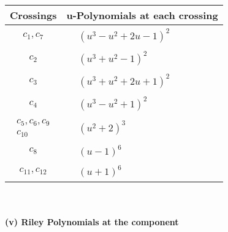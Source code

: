 \documentclass[1p]{elsarticle_modified}
\theoremstyle{definition}
\begin{document}
\begin{tabular}{m{50pt}|m{274pt}}
Crossings & \hspace{64pt}u-Polynomials at each crossing \\
\hline $$\begin{aligned}c_{1},c_{7}\end{aligned}$$&$\begin{aligned}
&(u^3- u^2+2 u-1)^2
\end{aligned}$\\
\hline $$\begin{aligned}c_{2}\end{aligned}$$&$\begin{aligned}
&(u^3+u^2-1)^2
\end{aligned}$\\
\hline $$\begin{aligned}c_{3}\end{aligned}$$&$\begin{aligned}
&(u^3+u^2+2 u+1)^2
\end{aligned}$\\
\hline $$\begin{aligned}c_{4}\end{aligned}$$&$\begin{aligned}
&(u^3- u^2+1)^2
\end{aligned}$\\
\hline $$\begin{aligned}c_{5},c_{6},c_{9}\\c_{10}\end{aligned}$$&$\begin{aligned}
&(u^2+2)^3
\end{aligned}$\\
\hline $$\begin{aligned}c_{8}\end{aligned}$$&$\begin{aligned}
&(u-1)^6
\end{aligned}$\\
\hline $$\begin{aligned}c_{11},c_{12}\end{aligned}$$&$\begin{aligned}
&(u+1)^6
\end{aligned}$\\
\hline
\end{tabular}\\~\\
\newpage\renewcommand{\arraystretch}{1}
\flushleft \textbf{(v) Riley Polynomials at the component}\newline \\
\end{document}

